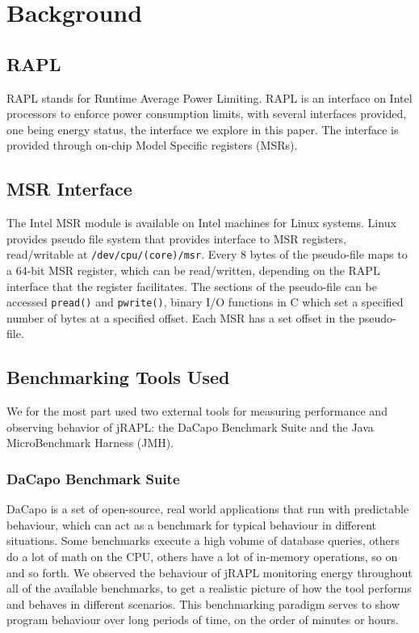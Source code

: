 \section{Background}


\subsection{RAPL}
RAPL stands for Runtime Average Power Limiting. RAPL is an interface on Intel processors to enforce power consumption limits, with several interfaces provided, one being energy status, the interface we explore in this paper. The interface is provided through on-chip Model Specific registers (MSRs).



\subsection{MSR Interface}
The Intel MSR module is available on Intel machines for Linux systems. Linux provides pseudo file system that provides interface to MSR registers, read/writable at \texttt{/dev/cpu/(core)/msr}. Every 8 bytes of the pseudo-file maps to a 64-bit MSR register, which can be read/written, depending on the RAPL interface that the register facilitates. The sections of the pseudo-file can be accessed \texttt{pread()} and \texttt{pwrite()}, binary I/O functions in C which set a specified number of bytes at a specified offset. Each MSR has a set offset in the pseudo-file.


\subsection{Benchmarking Tools Used}
We for the most part used two external tools for measuring performance and observing behavior of jRAPL: the DaCapo Benchmark Suite and the Java MicroBenchmark Harness (JMH).

\subsubsection{DaCapo Benchmark Suite}
DaCapo is a set of open-source, real world applications that run with predictable behaviour, which can act as a benchmark for typical behaviour in different situations. Some benchmarks execute a high volume of database queries, others do a lot of math on the CPU, others have a lot of in-memory operations, so on and so forth. We observed the behaviour of jRAPL monitoring energy throughout all of the available benchmarks, to get a realistic picture of how the tool performs and behaves in different scenarios. This benchmarking paradigm serves to show program behaviour over long periods of time, on the order of minutes or hours.

